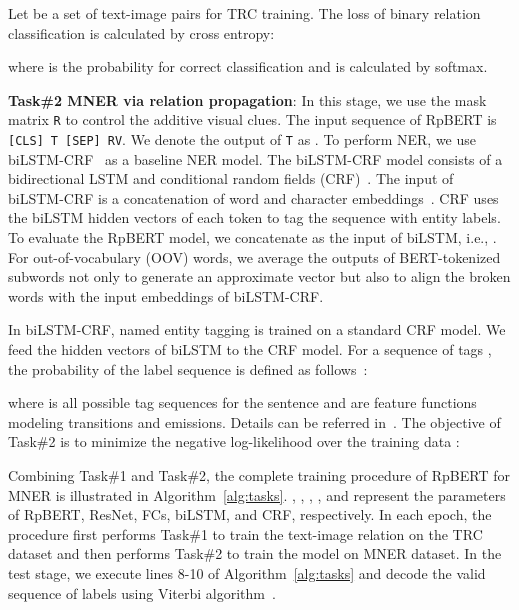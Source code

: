\documentclass[letterpaper]{article} \usepackage{aaai21}  \usepackage{times}  \usepackage{helvet} \usepackage{courier}  \usepackage[hyphens]{url}  \usepackage{graphicx} \urlstyle{rm} \def\UrlFont{\rm}  \usepackage{natbib}  \usepackage{caption} \frenchspacing  \setlength{\pdfpagewidth}{8.5in}  \setlength{\pdfpageheight}{11in}
\begin{document}
Let  be a set of text-image pairs for TRC training. 
The loss  of binary relation classification is calculated by cross entropy:
 
where   is the probability for correct classification and is calculated by softmax.


\smallskip
\noindent
\textbf{Task\#2  MNER via relation propagation}:
In this stage, we use the mask matrix \texttt{R} to control the additive visual clues.
The input sequence of RpBERT is \texttt{[CLS]}~\texttt{T}~\texttt{[SEP]}~\texttt{R}\texttt{V}.
We denote the output of \texttt{T} as .
To perform NER, we use  biLSTM-CRF~\cite{lample2016neural} as a baseline NER model.
The biLSTM-CRF model consists of a bidirectional LSTM and conditional random fields (CRF)~\cite{lafferty2001conditional}.
The  input  of biLSTM-CRF is a concatenation of word and character embeddings~\cite{lample2016neural}.
CRF uses the biLSTM hidden vectors of each token to tag the sequence with entity labels.
To evaluate the RpBERT model, we concatenate  as the input of biLSTM, i.e., .
For out-of-vocabulary (OOV) words, we average the outputs of BERT-tokenized subwords not only to generate an approximate vector but also to align the broken words with the input embeddings of biLSTM-CRF.



In biLSTM-CRF, named entity tagging is trained on a standard CRF model.
We feed the hidden vectors  of biLSTM to the CRF model.
For a sequence of tags , the probability of the label sequence  is defined as follows~\cite{lample2016neural}:

where  is all possible tag sequences for the sentence  and  are feature functions modeling transitions and emissions.
Details can be referred in~\cite{lample2016neural}.
The objective of Task\#2 is to minimize the negative log-likelihood over the training data :
 

\smallskip

Combining Task\#1 and Task\#2, the complete training procedure of RpBERT for MNER is illustrated in Algorithm~\ref{alg:tasks}. 
, , , , and  represent the parameters of RpBERT, ResNet, FCs, biLSTM, and CRF, respectively. 
In each epoch, the procedure first performs Task\#1 to train the text-image relation on the TRC dataset
and then performs Task\#2 to train the model on MNER dataset.
In the test stage, we execute lines 8-10 of Algorithm~\ref{alg:tasks} and decode the valid  sequence of labels using Viterbi algorithm~\cite{lafferty2001conditional}.
\end{document}
